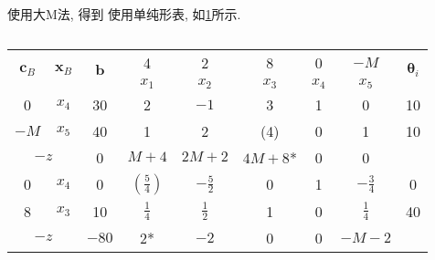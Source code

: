 使用大M法, 得到
使用单纯形表, 如\cref{table:10-1}所示.

\begin{table}[ht]
    \centering
    \caption{}
    \label{table:10-1}
    \begin{tabular}{|c|c|c|c|c|c|c|c|c|}
        \hline
        \multirow{2}{*}{$\bm{c}_B$} & \multirow{2}{*}{$\bm{x}_B$} & \multirow{2}{*}{$\bm{b}$} & \multicolumn{1}{c}{4} & \multicolumn{1}{c}{2} & \multicolumn{1}{c}{8} & \multicolumn{1}{c}{0} & $-M$ & \multirow{2}{*}{$\bm{\theta}_i$} \\
        \cline{4-8}
        &&& \multicolumn{1}{c}{$x_1$} & \multicolumn{1}{c}{$x_2$} & \multicolumn{1}{c}{$x_3$} & \multicolumn{1}{c}{$x_4$} & $x_5$ & \\
        \hline
        0 & $x_4$ & 30 & \multicolumn{1}{c}{2} & \multicolumn{1}{c}{$-1$} & \multicolumn{1}{c}{\cellcolor{LightBlue1}3} & \multicolumn{1}{c}{1} & 0 & 10 \\
        \cline{1-3}
        $-M$ & {\color{red}$x_5$} & 40 & \multicolumn{1}{c}{1} & \multicolumn{1}{c}{2} & \multicolumn{1}{c}{\cellcolor{LightBlue1}\color{red}(4)} & \multicolumn{1}{c}{0} & 1 & {\color{red}10} \\
        \hline
        \multicolumn{2}{|c|}{$-z$} & 0 & \multicolumn{1}{c}{$M+4$} & \multicolumn{1}{c}{$2M+2$} & \multicolumn{1}{c}{\cellcolor{LightBlue1}\color{red}$4M+8$*} & \multicolumn{1}{c}{0} & 0 & \\

        \hline

        0 & {\color{red}$x_4$} & 0 & \multicolumn{1}{c}{\cellcolor{LightBlue1}\color{red}$\left(\tfrac{5}{4}\right)$} & \multicolumn{1}{c}{$-\tfrac{5}{2}$} & \multicolumn{1}{c}{0} & \multicolumn{1}{c}{1} & $-\tfrac{3}{4}$ & {\color{red}0} \\
        \cline{1-3}
        8 & $x_3$ & 10 & \multicolumn{1}{c}{\cellcolor{LightBlue1}$\tfrac{1}{4}$} & \multicolumn{1}{c}{$\tfrac{1}{2}$} & \multicolumn{1}{c}{1} & \multicolumn{1}{c}{0} & $\tfrac{1}{4}$ & 40 \\
        \hline
        \multicolumn{2}{|c|}{$-z$} & $-80$ & \multicolumn{1}{c}{\cellcolor{LightBlue1}\color{red}2*} & \multicolumn{1}{c}{$-2$} & \multicolumn{1}{c}{0} & \multicolumn{1}{c}{0} & $-M-2$ & \\


\end{tabular}
\end{table}
